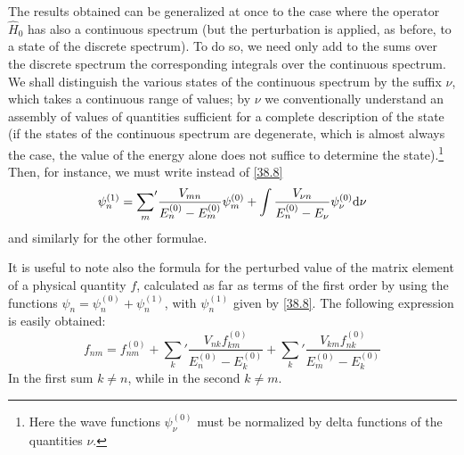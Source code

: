 The results obtained can be generalized at once to the case where the operator $ \hat{H}_0 $ has also a continuous spectrum (but the perturbation is applied, as before, to a state of the discrete spectrum). To do so, we need only add to the sums over the discrete spectrum the corresponding integrals over the continuous spectrum. We shall distinguish the various states of the continuous spectrum by the suffix $ \nu $, which takes a continuous range of values; by $ \nu $ we conventionally understand an assembly of values of quantities sufficient for a complete description of the state (if the states of the continuous spectrum are degenerate, which is almost always the case, the value of the energy alone does not suffice to determine the state).\footnote{Here the wave functions $ \psi_\nu^{(0)} $ must be normalized by delta functions of the quantities $\nu$.
} Then, for instance, we must write instead of \eqref{38.8}
\begin{equation}\label{38.11}
\psi_n^{(1)}={\sum_m}'\frac{V_{mn}}{E_n^{(0)}-E_m^{(0)}}\psi_m^{(0)}+\int\frac{V_{\nu n}}{E_n^{(0)}-E_\nu}\psi_\nu^{(0)}\mathrm{d}\nu
\end{equation}
and similarly for the other formulae.

It is useful to note also the formula for the perturbed value of the matrix element of a physical quantity $ f $, calculated as far as terms of the first order by using the functions $ \psi_n = \psi_n^{(0)} + \psi_n^{(1)} $, with $ \psi_n^{(1)} $ given by \eqref{38.8}. The following expression is easily obtained:
\begin{equation}\label{38.12}
f_{nm}=f_{nm}^{(0)}+{\sum_k}'\frac{V_{nk}f_{km}^{(0)}}{E_n^{(0)}-E_k^{(0)}}+{\sum_k}'\frac{V_{km}f_{nk}^{(0)}}{E_m^{(0)}-E_k^{(0)}}
\end{equation}
In the first sum $ k \ne n $, while in the second $ k \ne m $.





